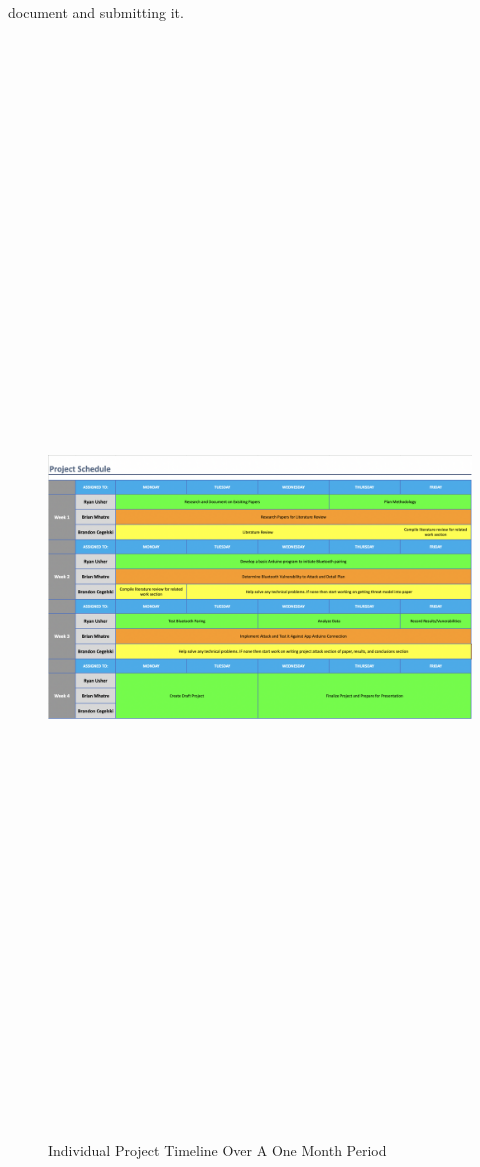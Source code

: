\documentclass{article}
\begin{document}
document and submitting it.

    

    \begin{figure}[htp]
    \centering
    \includegraphics[width=12cm,height=30cm,keepaspectratio]{IndividualTimeline.png}
    \caption{Individual Project Timeline Over A One Month Period}
\end{figure}
\end{document}
